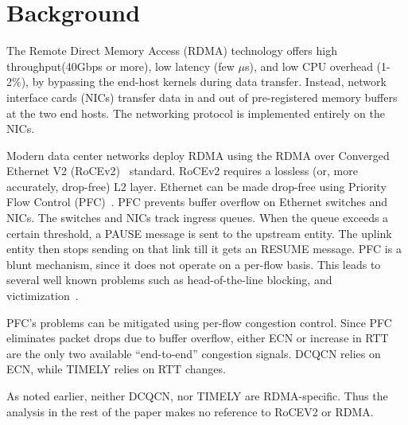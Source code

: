 \section{Background}
The Remote Direct Memory Access (RDMA) technology offers high throughput(40Gbps
or more), low latency (few $\mu$s), and low CPU overhead (1-2\%), by bypassing
the end-host kernels during data transfer. Instead, network interface cards
(NICs) transfer data in and out of pre-registered memory buffers at the two end
hosts. The networking protocol is implemented entirely on the NICs.

Modern data center networks deploy RDMA using the RDMA over Converged Ethernet
V2 (RoCEv2)~\cite{rocev2} standard.  RoCEv2 requires a lossless (or, more
accurately, drop-free) L2 layer. Ethernet can be made drop-free using Priority
Flow Control (PFC)~\cite{pfc}. PFC prevents buffer overflow on Ethernet switches
and NICs. The switches and NICs track ingress queues. When the queue exceeds a
certain threshold, a PAUSE message is sent to the upstream entity. The uplink
entity then stops sending on that link till it gets an RESUME message.  PFC is a
blunt mechanism, since it does not operate on a per-flow basis. This leads to
several well known problems such as head-of-the-line blocking, and
victimization~\cite{dcqcn,tcp-bolt}. 

PFC's problems can be mitigated using per-flow congestion control. Since PFC
eliminates packet drops due to buffer overflow, either ECN or increase in RTT
are the only two available ``end-to-end'' congestion signals.  DCQCN relies on
ECN, while TIMELY relies on RTT changes.

As noted earlier, neither DCQCN, nor TIMELY are RDMA-specific. Thus the analysis
in the rest of the paper makes no reference to RoCEV2 or RDMA.

